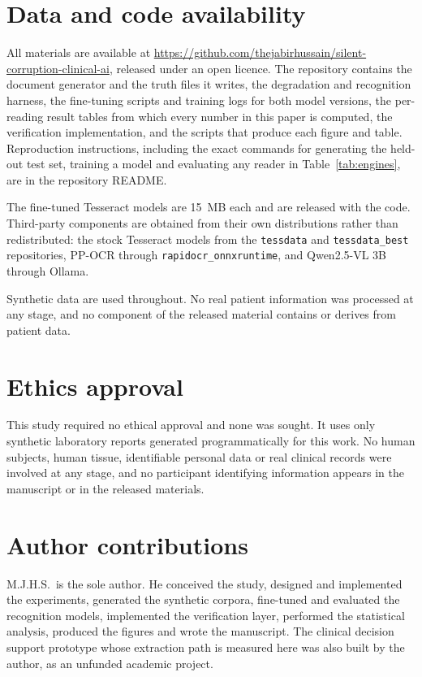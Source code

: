 \documentclass[11pt]{article}
\newif\ifanon
\begin{document}
\section*{Data and code availability}

\ifanon
All materials are provided through an anonymised repository link with the submission.
\else
All materials are available at
\url{https://github.com/thejabirhussain/silent-corruption-clinical-ai}, released under an open
licence. The repository contains the document generator and the truth files it writes, the
degradation and recognition harness, the fine-tuning scripts and training logs for both model
versions, the per-reading result tables from which every number in this paper is computed, the
verification implementation, and the scripts that produce each figure and table. Reproduction
instructions, including the exact commands for generating the held-out test set, training a
model and evaluating any reader in Table~\ref{tab:engines}, are in the repository README.

The fine-tuned Tesseract models are 15~MB each and are released with the code. Third-party
components are obtained from their own distributions rather than redistributed: the stock
Tesseract models from the \texttt{tessdata} and \texttt{tessdata\_best} repositories, PP-OCR
through \texttt{rapidocr\_onnxruntime}, and Qwen2.5-VL 3B through Ollama.
\fi

Synthetic data are used throughout. No real patient information was processed at any stage, and
no component of the released material contains or derives from patient data.

\section*{Ethics approval}

This study required no ethical approval and none was sought. It uses only synthetic laboratory
reports generated programmatically for this work. No human subjects, human tissue, identifiable
personal data or real clinical records were involved at any stage, and no participant
identifying information appears in the manuscript or in the released materials.

\section*{Author contributions}

M.J.H.S.\ is the sole author. He conceived the study, designed and implemented the experiments,
generated the synthetic corpora, fine-tuned and evaluated the recognition models, implemented
the verification layer, performed the statistical analysis, produced the figures and wrote the
manuscript. The clinical decision support prototype whose extraction path is measured here was
also built by the author, as an unfunded academic project.
\end{document}
